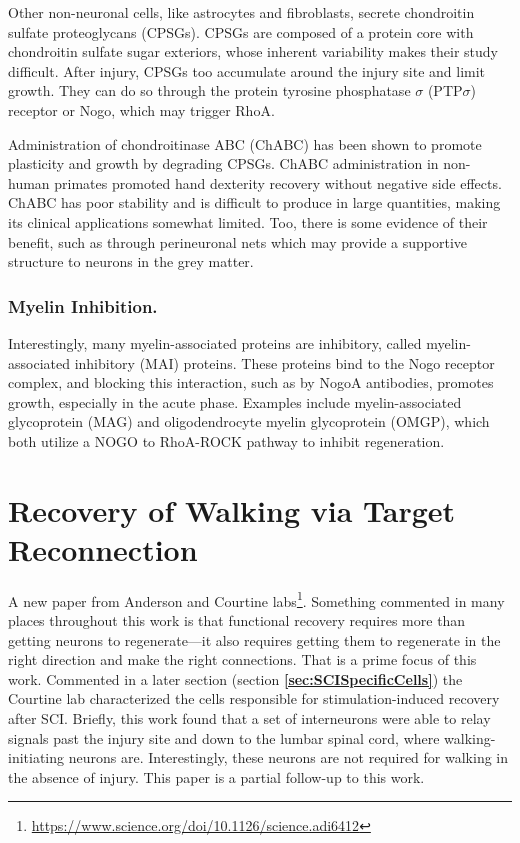 \documentclass[12pt]{report}
\begin{document}
Other non-neuronal cells, like astrocytes and fibroblasts, secrete chondroitin sulfate proteoglycans (CPSGs). CPSGs are composed of a protein core with chondroitin sulfate sugar exteriors, whose inherent variability makes their study difficult. After injury, CPSGs too accumulate around the injury site and limit growth.  They can do so through the protein tyrosine phosphatase $\sigma$ (PTP$\sigma$) receptor or Nogo, which may trigger RhoA.  \newline

Administration of chondroitinase ABC (ChABC) has been shown to promote plasticity and growth by degrading CPSGs. ChABC administration in non-human primates promoted hand dexterity recovery without negative side effects. ChABC has poor stability and is difficult to produce in large quantities, making its clinical applications somewhat limited. Too, there is some evidence of their benefit, such as through perineuronal nets which may provide a supportive structure to neurons in the grey matter.\newline  


\subsubsection{Myelin Inhibition.}

Interestingly, many myelin-associated proteins are inhibitory, called myelin-associated inhibitory (MAI) proteins. These proteins bind to the Nogo receptor complex, and blocking this interaction, such as by NogoA antibodies, promotes growth, especially in the acute phase. Examples include myelin-associated glycoprotein (MAG) and oligodendrocyte myelin glycoprotein (OMGP), which both utilize a NOGO to RhoA-ROCK pathway to inhibit regeneration. 

\section{Recovery of Walking via Target Reconnection}

A new paper from Anderson and Courtine labs\footnote{\url{https://www.science.org/doi/10.1126/science.adi6412}}.  Something commented in many places throughout this work is that functional recovery requires more than getting neurons to regenerate---it also requires getting them to regenerate in the right direction and make the right connections. That is a prime focus of this work. Commented in a later section (section \textbf{\ref{sec:SCISpecificCells}}) the Courtine lab characterized the cells responsible for stimulation-induced recovery after SCI. Briefly, this work found that a set of interneurons were able to relay signals past the injury site and down to the lumbar spinal cord, where walking-initiating neurons are. Interestingly, these neurons are not required for walking in the absence of injury. This paper is a partial follow-up to this work.\newline
\end{document}
